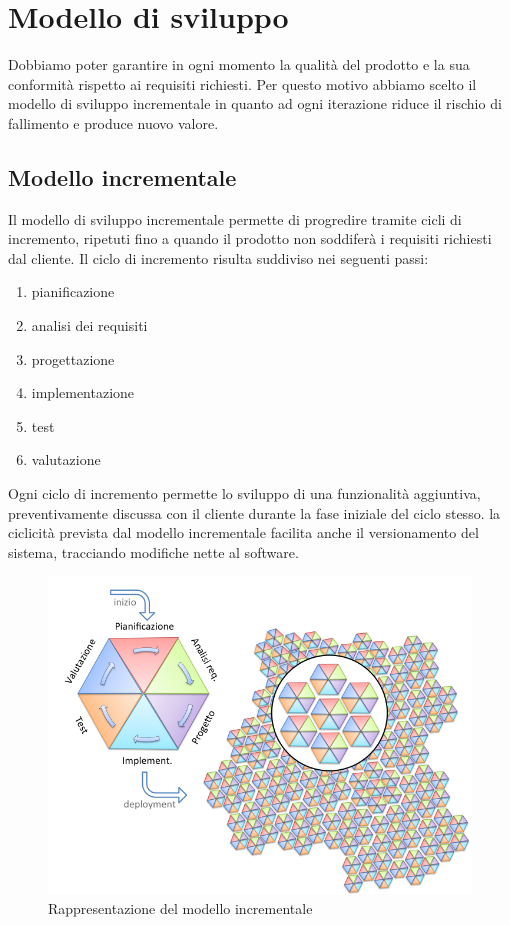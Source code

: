 \section{Modello di sviluppo}

Dobbiamo poter garantire in ogni momento la qualità del prodotto e la sua conformità rispetto ai requisiti richiesti.
Per questo motivo abbiamo scelto il modello di sviluppo incrementale in quanto ad ogni iterazione 
riduce il rischio di fallimento e produce nuovo valore.

\subsection{Modello incrementale}

Il modello di sviluppo incrementale permette di progredire tramite cicli di incremento, 
ripetuti fino a quando il prodotto non soddiferà i requisiti richiesti dal cliente.
Il ciclo di incremento risulta suddiviso nei seguenti passi:
\begin{enumerate}
    \item pianificazione
    \item analisi dei requisiti
    \item progettazione
    \item implementazione
    \item test
    \item valutazione
\end{enumerate}
Ogni ciclo di incremento permette lo sviluppo di una funzionalità aggiuntiva,
preventivamente discussa con il cliente durante la fase iniziale del ciclo stesso.
la ciclicità prevista dal modello incrementale facilita anche il versionamento del sistema,
tracciando modifiche nette al software.

\begin{figure}[H]
    \centering
    \includegraphics[scale = 0.5]{img/incrementale.png}
    \caption{Rappresentazione del modello incrementale}
    \label{fig:logo}
\end{figure}

